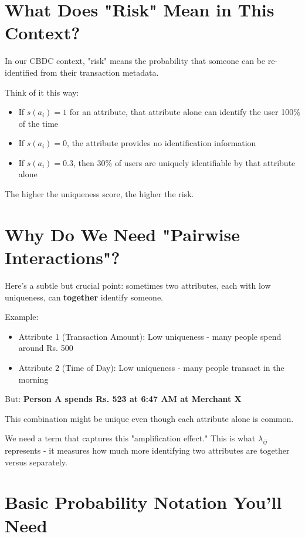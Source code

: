 \documentclass[12pt,a4paper,oneside,openany]{report}
\begin{document}
\section{What Does "Risk" Mean in This Context?}
\label{sec:risk}

In our CBDC context, "risk" means the probability that someone can be re-identified from their transaction metadata.

Think of it this way:
\begin{itemize}
    \item If $s(a_i) = 1$ for an attribute, that attribute alone can identify the user 100\% of the time
    \item If $s(a_i) = 0$, the attribute provides no identification information
    \item If $s(a_i) = 0.3$, then 30\% of users are uniquely identifiable by that attribute alone
\end{itemize}

The higher the uniqueness score, the higher the risk.

\section{Why Do We Need "Pairwise Interactions"?}
\label{sec:interactions}

Here's a subtle but crucial point: sometimes two attributes, each with low uniqueness, can \textbf{together} identify someone.

Example:
\begin{itemize}
    \item Attribute 1 (Transaction Amount): Low uniqueness - many people spend around Rs. 500
    \item Attribute 2 (Time of Day): Low uniqueness - many people transact in the morning
\end{itemize}

But: \textbf{Person A spends Rs. 523 at 6:47 AM at Merchant X}

This combination might be unique even though each attribute alone is common.

We need a term that captures this "amplification effect." This is what $\lambda_{ij}$ represents - it measures how much more identifying two attributes are together versus separately.

\section{Basic Probability Notation You'll Need}
\label{sec:notation}
\end{document}
